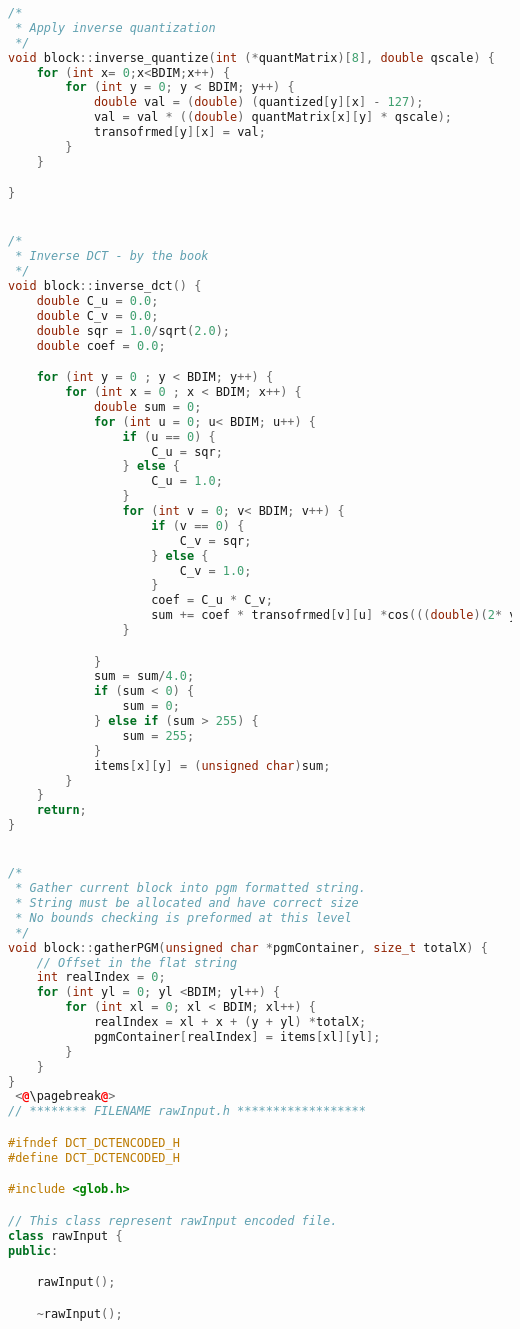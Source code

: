 \documentclass{report}
\begin{document}
\begin{lstlisting}[language=C++]
/*
 * Apply inverse quantization
 */
void block::inverse_quantize(int (*quantMatrix)[8], double qscale) {
    for (int x= 0;x<BDIM;x++) {
        for (int y = 0; y < BDIM; y++) {
            double val = (double) (quantized[y][x] - 127);
            val = val * ((double) quantMatrix[x][y] * qscale);
            transofrmed[y][x] = val;
        }
    }

}


/*
 * Inverse DCT - by the book
 */
void block::inverse_dct() {
    double C_u = 0.0;
    double C_v = 0.0;
    double sqr = 1.0/sqrt(2.0);
    double coef = 0.0;

    for (int y = 0 ; y < BDIM; y++) {
        for (int x = 0 ; x < BDIM; x++) {
            double sum = 0;
            for (int u = 0; u< BDIM; u++) {
                if (u == 0) {
                    C_u = sqr;
                } else {
                    C_u = 1.0;
                }
                for (int v = 0; v< BDIM; v++) {
                    if (v == 0) {
                        C_v = sqr;
                    } else {
                        C_v = 1.0;
                    }
                    coef = C_u * C_v;
                    sum += coef * transofrmed[v][u] *cos(((double)(2* y +1)*(double)u*M_PI)/16.0)*cos(((double)(2* x +1)*(double)v*M_PI)/16.0);
                }

            }
            sum = sum/4.0;
            if (sum < 0) {
                sum = 0;
            } else if (sum > 255) {
                sum = 255;
            }
            items[x][y] = (unsigned char)sum;
        }
    }
    return;
}


/*
 * Gather current block into pgm formatted string.
 * String must be allocated and have correct size
 * No bounds checking is preformed at this level
 */
void block::gatherPGM(unsigned char *pgmContainer, size_t totalX) {
    // Offset in the flat string
    int realIndex = 0;
    for (int yl = 0; yl <BDIM; yl++) {
        for (int xl = 0; xl < BDIM; xl++) {
            realIndex = xl + x + (y + yl) *totalX;
            pgmContainer[realIndex] = items[xl][yl];
        }
    }
}
 <@\pagebreak@>
// ******** FILENAME rawInput.h ******************

#ifndef DCT_DCTENCODED_H
#define DCT_DCTENCODED_H

#include <glob.h>

// This class represent rawInput encoded file.
class rawInput {
public:

    rawInput();

    ~rawInput();


\end{lstlisting}
\end{document}

